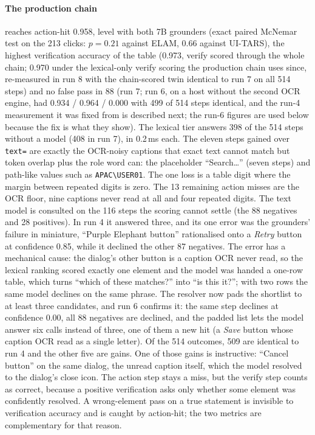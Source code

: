 \documentclass[conference]{IEEEtran}
\newcommand{\code}[1]{\texttt{#1}}
\begin{document}
\paragraph{The production chain} reaches action-hit 0.958, level with both 7B grounders (exact paired McNemar test on the 213 clicks: $p = 0.21$ against ELAM, $0.66$ against UI-TARS), the highest verification accuracy of the table (0.973, verify scored through the whole chain; 0.970 under the lexical-only verify scoring the production chain uses since, re-measured in run 8 with the chain-scored twin identical to run 7 on all 514 steps) and no false pass in 88 (run 7; run 6, on a host without the second OCR engine, had 0.934 / 0.964 / 0.000 with 499 of 514 steps identical, and the run-4 measurement it was fixed from is described next; the run-6 figures are used below because the fix is what they show). The lexical tier answers 398 of the 514 steps without a model (408 in run 7), in 0.2\,ms each. The eleven steps gained over \code{text=} are exactly the OCR-noisy captions that exact text cannot match but token overlap plus the role word can: the placeholder ``Search\ldots'' (seven steps) and path-like values such as \code{APAC\textbackslash USER01}. The one loss is a table digit where the margin between repeated digits is zero. The 13 remaining action misses are the OCR floor, nine captions never read at all and four repeated digits. The text model is consulted on the 116 steps the scoring cannot settle (the 88 negatives and 28 positives). In run 4 it answered three, and its one error was the grounders' failure in miniature, ``Purple Elephant button'' rationalised onto a \emph{Retry} button at confidence 0.85, while it declined the other 87 negatives. The error has a mechanical cause: the dialog's other button is a caption OCR never read, so the lexical ranking scored exactly one element and the model was handed a one-row table, which turns ``which of these matches?'' into ``is this it?''; with two rows the same model declines on the same phrase. The resolver now pads the shortlist to at least three candidates, and run 6 confirms it: the same step declines at confidence 0.00, all 88 negatives are declined, and the padded list lets the model answer six calls instead of three, one of them a new hit (a \emph{Save} button whose caption OCR read as a single letter). Of the 514 outcomes, 509 are identical to run 4 and the other five are gains. One of those gains is instructive: ``Cancel button'' on the same dialog, the unread caption itself, which the model resolved to the dialog's close icon. The action step stays a miss, but the verify step counts as correct, because a positive verification asks only whether some element was confidently resolved. A wrong-element pass on a true statement is invisible to verification accuracy and is caught by action-hit; the two metrics are complementary for that reason.
\end{document}
